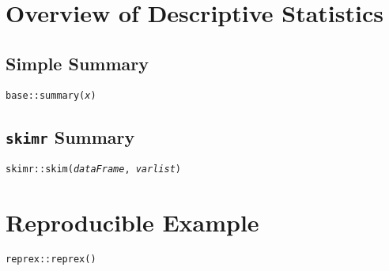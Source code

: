 \documentclass{tufte-handout}
\newenvironment{subs}
  {\adjustwidth{3em}{0pt}}
  {\endadjustwidth}
\begin{document}
\vspace{5mm}
\section{Overview of Descriptive Statistics}
\begin{subs}
\subsection{Simple Summary}
\texttt{base::}{\color{red}\texttt{summary}}\texttt{(\textit{x})}

\vspace{3mm}
\subsection{\texttt{skimr} Summary}
\texttt{skimr::}{\color{red}\texttt{skim}}\texttt{(\textit{dataFrame}, \textit{varlist})}
\end{subs}

\vspace{5mm}
\section{Reproducible Example}
\texttt{reprex::}{\color{red}\texttt{reprex}}\texttt{()}
\end{document}
